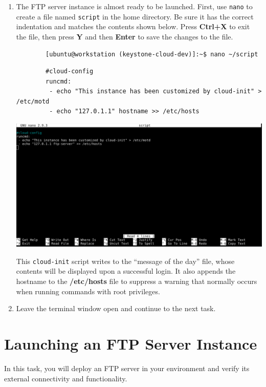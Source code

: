 \documentclass[letterpaper, 12pt]{article}
\begin{document}
\begin{enumerate}
    \item The FTP server instance is almost ready to be launched. First, use \texttt{nano} to create a file named
    \texttt{script} in the home directory. Be sure it has the correct indentation and matches the contents shown below.
    Press \textbf{Ctrl+X} to exit the file, then press \textbf{Y} and then \textbf{Enter} to save the changes to the
    file.
    \begin{lstlisting}
        [ubuntu@workstation (keystone-cloud-dev)]:~$ nano ~/script
    \end{lstlisting}
    \begin{lstlisting}
        #cloud-config
        runcmd:
         - echo "This instance has been customized by cloud-init" > /etc/motd
         - echo "127.0.1.1" hostname >> /etc/hosts
    \end{lstlisting}

    \begin{center}
        \includegraphics[width=\linewidth]{images/part1/step37.png}
    \end{center}

    \begin{notebox}
        This \texttt{cloud-init} script writes to the ``message of the day'' file, whose contents will be displayed
        upon a successful login. It also appends the hostname to the \textbf{/etc/hosts} file to suppress a warning that
        normally occurs when running commands with root privileges.
    \end{notebox}

    \item Leave the terminal window open and continue to the next task.
\end{enumerate}

\section{Launching an FTP Server Instance}
\label{sec:launch_an_ftp_server_instance}
In this task, you will deploy an FTP server in your environment and verify its external connectivity and functionality.
\end{document}
